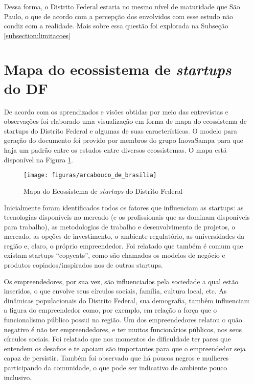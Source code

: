 Dessa forma, o Distrito Federal estaria no mesmo nível de maturidade que São Paulo, o que de acordo com a percepção dos envolvidos com esse estudo não condiz com a realidade. Mais sobre essa questão foi explorada na Subseção \ref{subsection:limitacoes}

\section{Mapa do ecossistema de \textit{startups} do DF}
\label{mapa_do_ecossistema_do_distrito_federal}

De acordo com os aprendizados e visões obtidas por meio das entrevistas e observações foi elaborado uma visualização em forma de mapa do ecossistema de startups do Distrito Federal e algumas de suas características. O modelo para geração do documento foi provido por membros do grupo InovaSampa para que haja um padrão entre os estudos entre diversos ecossistemas. O mapa está disponível na Figura \ref{figure:mapa_do_ecossistema}.

\begin{figure}[!htb]
	\centering
	\texttt{[image: figuras/arcabouco\_de\_brasilia]}
	\caption{Mapa do Ecossistema de \textit{startups} do Distrito Federal}
	\label{figure:mapa_do_ecossistema}
\end{figure} 

Inicialmente foram identificados todos os fatores que influenciam as startups: as tecnologias disponíveis no mercado (e os profissionais que as dominam disponíveis para trabalho), as metodologias de trabalho e desenvolvimento de projetos, o mercado, as opções de investimento, o ambiente regulatório, as universidades da região e, claro, o próprio empreendedor. Foi relatado que também é comum que existam startups ``copycats'', como são chamados os modelos de negócio e produtos copiados/inspirados nos de outras startups.

Os empreendedores, por sua vez, são influenciados pela sociedade a qual estão inseridos, o que envolve seus círculos sociais, família, cultura local, etc. As dinâmicas populacionais do Distrito Federal, sua demografia, também influenciam a figura do empreendedor como, por exemplo, em relação a força que o funcionalismo público possui na região. Um dos empreendedores relatou o quão negativo é não ter empreendedores, e ter muitos funcionários públicos, nos seus círculos sociais. Foi relatado que nos momentos de dificuldade ter pares que entendem os desafios e te apoiam são importantes para que o empreendedor seja capaz de persistir. Também foi observado que há poucos negros e mulheres participando da comunidade, o que pode ser indicativo de ambiente pouco inclusivo. 


